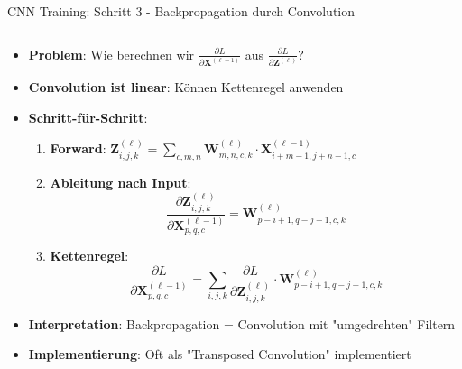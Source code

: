 \documentclass[aspectratio=1610, xcolor=dvipsnames, 9pt]{beamer}
\begin{document}
      \begin{frame}{CNN Training: Schritt 3 - Backpropagation durch Convolution}
        \begin{columns}
          \begin{column}{1\textwidth}
            \begin{itemize}
              \item \textbf{Problem}: Wie berechnen wir $\frac{\partial L}{\partial \mathbf{X}^{(\ell-1)}}$ aus $\frac{\partial L}{\partial \mathbf{Z}^{(\ell)}}$?
              \item \textbf{Convolution ist linear}: Können Kettenregel anwenden
              \item \textbf{Schritt-für-Schritt}:
              \begin{enumerate}
                \item \textbf{Forward}: $\mathbf{Z}^{(\ell)}_{i,j,k} = \sum_{c,m,n} \mathbf{W}^{(\ell)}_{m,n,c,k} \cdot \mathbf{X}^{(\ell-1)}_{i+m-1,j+n-1,c}$
                \item \textbf{Ableitung nach Input}: 
                \begin{equation}
                  \frac{\partial \mathbf{Z}^{(\ell)}_{i,j,k}}{\partial \mathbf{X}^{(\ell-1)}_{p,q,c}} = \mathbf{W}^{(\ell)}_{p-i+1,q-j+1,c,k}
                \end{equation}
                \item \textbf{Kettenregel}:
                \begin{equation}
                  \frac{\partial L}{\partial \mathbf{X}^{(\ell-1)}_{p,q,c}} = \sum_{i,j,k} \frac{\partial L}{\partial \mathbf{Z}^{(\ell)}_{i,j,k}} \cdot \mathbf{W}^{(\ell)}_{p-i+1,q-j+1,c,k}
                \end{equation}
              \end{enumerate}
              \item \textbf{Interpretation}: Backpropagation = Convolution mit "umgedrehten" Filtern
              \item \textbf{Implementierung}: Oft als "Transposed Convolution" implementiert
            \end{itemize}
          \end{column}
        \end{columns}
      \end{frame}
\end{document}
